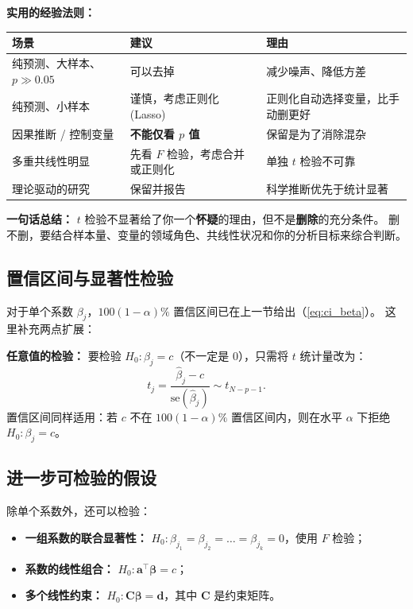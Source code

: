 \medskip
\noindent
\textbf{实用的经验法则：}

\begin{center}
\renewcommand{\arraystretch}{1.4}
\begin{tabular}{p{5cm}|p{5cm}|p{5cm}}
\toprule
\textbf{场景} & \textbf{建议} & \textbf{理由} \\
\midrule
纯预测、大样本、$p \gg 0.05$ & 可以去掉 & 减少噪声、降低方差 \\
纯预测、小样本 & 谨慎，考虑正则化 (Lasso) & 正则化自动选择变量，比手动删更好 \\
因果推断 / 控制变量 & \textbf{不能仅看 $p$ 值} & 保留是为了消除混杂 \\
多重共线性明显 & 先看 $F$ 检验，考虑合并或正则化 & 单独 $t$ 检验不可靠 \\
理论驱动的研究 & 保留并报告 & 科学推断优先于统计显著 \\
\bottomrule
\end{tabular}
\end{center}

\medskip
\noindent
\textbf{一句话总结：} $t$ 检验不显著给了你一个\textbf{怀疑}的理由，但不是\textbf{删除}的充分条件。
删不删，要结合样本量、变量的领域角色、共线性状况和你的分析目标来综合判断。

\subsection{置信区间与显著性检验}

对于单个系数 $\beta_j$，$100(1-\alpha)\%$ 置信区间已在上一节给出（\ref{eq:ci_beta}）。
这里补充两点扩展：

\textbf{任意值的检验：} 要检验 $H_0: \beta_j = c$（不一定是 0），只需将 $t$ 统计量改为：
\[
    t_j = \frac{\hat{\beta}_j - c}{\mathrm{se}(\hat{\beta}_j)} \sim t_{N-p-1}.
\]
置信区间同样适用：若 $c$ 不在 $100(1-\alpha)\%$ 置信区间内，则在水平 $\alpha$ 下拒绝 $H_0: \beta_j = c$。

\subsection{进一步可检验的假设}

除单个系数外，还可以检验：

\begin{itemize}
    \item \textbf{一组系数的联合显著性：} $H_0: \beta_{j_1} = \beta_{j_2} = \dots = \beta_{j_k} = 0$，使用 $F$ 检验；
    \item \textbf{系数的线性组合：} $H_0: \mathbf{a}^\top \bm{\beta} = c$；
    \item \textbf{多个线性约束：} $H_0: \mathbf{C}\bm{\beta} = \mathbf{d}$，其中 $\mathbf{C}$ 是约束矩阵。
\end{itemize}

